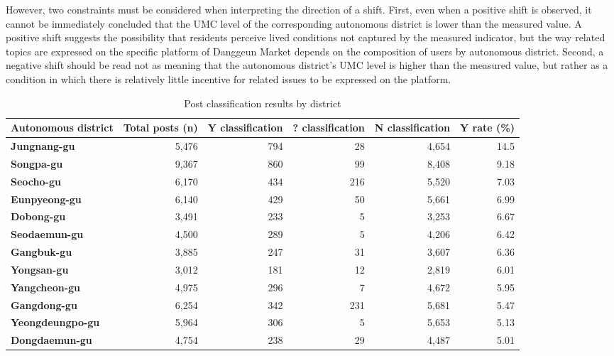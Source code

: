 However, two constraints must be considered when interpreting the direction of a shift. First, even when a positive shift is observed, it cannot be immediately concluded that the UMC level of the corresponding autonomous district is lower than the measured value. A positive shift suggests the possibility that residents perceive lived conditions not captured by the measured indicator, but the way related topics are expressed on the specific platform of Danggeun Market depends on the composition of users by autonomous district. Second, a negative shift should be read not as meaning that the autonomous district's UMC level is higher than the measured value, but rather as a condition in which there is relatively little incentive for related issues to be expressed on the platform.

\begin{table}[htbp]
  \centering\small
  \caption{Post classification results by district}
  \label{tab:7-district-cls}
  \begin{tabularx}{\textwidth}{l r r r r r}
    \toprule
    \textbf{Autonomous district} & \textbf{Total posts (n)} & \textbf{Y classification} & \textbf{? classification} & \textbf{N classification} & \textbf{Y rate (\%)} \\
    \midrule
    \textbf{Jungnang-gu}    & 5{,}476  & 794 & 28  & 4{,}654  & 14.5 \\
    \textbf{Songpa-gu}      & 9{,}367  & 860 & 99  & 8{,}408  & 9.18 \\
    \textbf{Seocho-gu}      & 6{,}170  & 434 & 216 & 5{,}520  & 7.03 \\
    \textbf{Eunpyeong-gu}   & 6{,}140  & 429 & 50  & 5{,}661  & 6.99 \\
    \textbf{Dobong-gu}      & 3{,}491  & 233 & 5   & 3{,}253  & 6.67 \\
    \textbf{Seodaemun-gu}   & 4{,}500  & 289 & 5   & 4{,}206  & 6.42 \\
    \textbf{Gangbuk-gu}     & 3{,}885  & 247 & 31  & 3{,}607  & 6.36 \\
    \textbf{Yongsan-gu}     & 3{,}012  & 181 & 12  & 2{,}819  & 6.01 \\
    \textbf{Yangcheon-gu}   & 4{,}975  & 296 & 7   & 4{,}672  & 5.95 \\
    \textbf{Gangdong-gu}    & 6{,}254  & 342 & 231 & 5{,}681  & 5.47 \\
    \textbf{Yeongdeungpo-gu}& 5{,}964  & 306 & 5   & 5{,}653  & 5.13 \\
    \textbf{Dongdaemun-gu}  & 4{,}754  & 238 & 29  & 4{,}487  & 5.01 \\

\end{tabularx}
\end{table}
